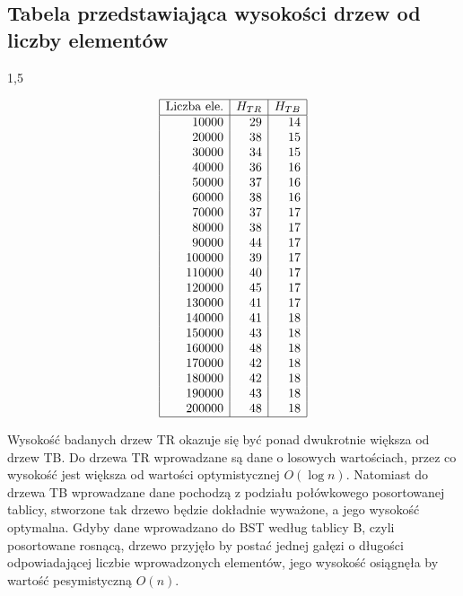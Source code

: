 \documentclass[polish,polish,a4paper]{article}
\begin{document}
\subsection*{Tabela przedstawiająca wysokości drzew od liczby elementów}
\begin{spacing}{1,5}
\begin{figure}[H]

	\centering
	\begin{equation*}
	\begin{array}{|r|r|r|}
	\hline
	\multicolumn{1}{|c|}{$Liczba ele.$}&\multicolumn{1}{c|}{H_{TR}}&\multicolumn{1}{c|}{H_{TB}}\\ \hline
10000&29&14\\
20000&38&15\\
30000&34&15\\
40000&36&16\\
50000&37&16\\
60000&38&16\\
70000&37&17\\
80000&38&17\\
90000&44&17\\
100000&39&17\\
110000&40&17\\
120000&45&17\\
130000&41&17\\
140000&41&18\\
150000&43&18\\
160000&48&18\\
170000&42&18\\
180000&42&18\\
190000&43&18\\
200000&48&18\\\hline
	\end{array}
	\end{equation*}
\end{figure}
\end{spacing}

Wysokość badanych drzew TR okazuje się być ponad dwukrotnie większa od drzew TB. Do drzewa TR wprowadzane są dane o losowych wartościach, przez co wysokość jest większa od wartości optymistycznej $O(\log{n})$. Natomiast do drzewa TB wprowadzane dane pochodzą z podziału połówkowego posortowanej tablicy, stworzone tak drzewo będzie dokładnie wyważone, a jego wysokość optymalna.
Gdyby dane wprowadzano do BST według tablicy B, czyli posortowane rosnącą, drzewo przyjęło by postać jednej gałęzi o długości odpowiadającej liczbie wprowadzonych elementów, jego wysokość osiągnęła by wartość pesymistyczną $ O(n) $.
\end{document}
